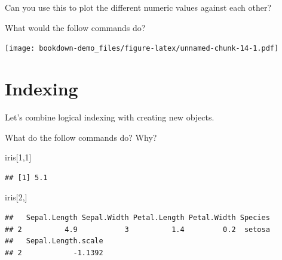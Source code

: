 \documentclass[]{book}
\newenvironment{Shaded}{\begin{snugshade}}{\end{snugshade}}
\newcommand{\KeywordTok}[1]{\textcolor[rgb]{0.13,0.29,0.53}{\textbf{#1}}}
\newcommand{\DecValTok}[1]{\textcolor[rgb]{0.00,0.00,0.81}{#1}}
\newcommand{\StringTok}[1]{\textcolor[rgb]{0.31,0.60,0.02}{#1}}
\newcommand{\OperatorTok}[1]{\textcolor[rgb]{0.81,0.36,0.00}{\textbf{#1}}}
\newcommand{\NormalTok}[1]{#1}
\theoremstyle{definition}
\theoremstyle{definition}
\theoremstyle{definition}
\theoremstyle{remark}
\begin{document}
Can you use this to plot the different numeric values against each
other?

What would the follow commands do?

\begin{Shaded}
\end{Shaded}

\texttt{[image: bookdown-demo\_files/figure-latex/unnamed-chunk-14-1.pdf]}

\begin{Shaded}
\end{Shaded}

\section{Indexing}\label{indexing}

Let's combine logical indexing with creating new objects.

What do the follow commands do? Why?

\begin{Shaded}
\begin{Highlighting}[]
\NormalTok{iris[}\DecValTok{1}\NormalTok{,}\DecValTok{1}\NormalTok{]}
\end{Highlighting}
\end{Shaded}

\begin{verbatim}
## [1] 5.1
\end{verbatim}

\begin{Shaded}
\begin{Highlighting}[]
\NormalTok{iris[}\DecValTok{2}\NormalTok{,]}
\end{Highlighting}
\end{Shaded}

\begin{verbatim}
##   Sepal.Length Sepal.Width Petal.Length Petal.Width Species
## 2          4.9           3          1.4         0.2  setosa
##   Sepal.Length.scale
## 2            -1.1392
\end{verbatim}
\end{document}
